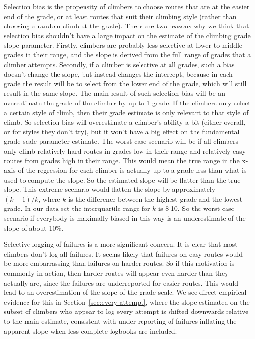 \documentclass[12pt]{article}
\begin{document}
Selection bias is the propensity of climbers to choose routes that are at the easier end of the grade, or at least routes that suit their climbing style (rather than choosing a random climb at the grade). There are two reasons why we think that selection bias shouldn't have a large impact on the estimate of the climbing grade slope parameter. Firstly, climbers are probably less selective at lower to middle grades in their range, and the slope is derived from the full range of grades that a climber attempts. Secondly, if a climber is selective at all grades, such a bias doesn't change the slope, but instead changes the intercept, because in each grade the result will be to select from the lower end of the grade, which will still result in the same slope. The main result of such selection bias will be an overestimate the grade of the climber by up to 1 grade. If the climbers only select a certain style of climb, then their grade estimate is only relevant to that style of climb. So selection bias will overestimate a climber's ability a bit (either overall, or for styles they don't try), but it won't have a big effect on the fundamental grade scale parameter estimate. The worst case scenario will be if all climbers only climb relatively hard routes in grades low in their range and relatively easy routes from grades high in their range. This would mean the true range in the x-axis of the regression for each climber is actually up to a grade less than what is used to compute the slope. So the estimated slope will be flatter than the true slope. This extreme scenario would flatten the slope by approximately $(k-1)/k$, where $k$ is the difference between the highest grade and the lowest grade. In our data set the interquartile range for $k$ is 8-10. So the worst case scenario if everybody is maximally biased in this way is an underestimate of the slope of about 10\%.

Selective logging of failures is a more significant concern. It is clear that most climbers don't log all failures. It seems likely that failures on easy routes would be more embarrassing than failures on harder routes. So if this motivation is commonly in action, then harder routes will appear even harder than they actually are, since the failures are underreported for easier routes. This would lead to an overestimation of the slope of the grade scale. We see direct empirical evidence for this in Section~\ref{sec:every-attempt}, where the slope estimated on the subset of climbers who appear to log every attempt is shifted downwards relative to the main estimate, consistent with under-reporting of failures inflating the apparent slope when less-complete logbooks are included.
\end{document}
